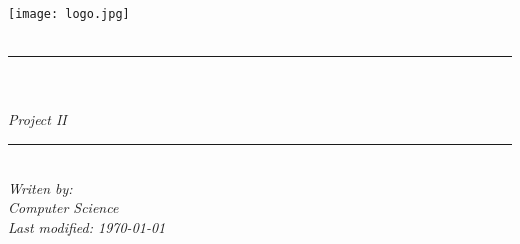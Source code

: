 \documentclass[11pt, a4paper, oneside]{Thesis}
\title{\ttitle} %
\begin{document}
\frontmatter 


\fancyhead{} %
\rhead{\thepage} %
\lhead{} %

\pagestyle{fancy} %

\newcommand{\HRule}{\rule{\linewidth}{0.5mm}} %

\hypersetup{pdfsubject=\subjectname}
\hypersetup{pdfauthor=\authornames}
\hypersetup{pdfkeywords=\keywordnames}


\begin{titlepage}
\begin{center}

\texttt{[image: logo.jpg]}\\[1cm] %
\textsc{\LARGE \univname}\\[1.5cm] %
\HRule \\[1.0cm] %
{\huge \bfseries \ttitle}\\[0.4cm] %

\huge \textit {Project II}\\[0.1cm] %
\HRule \\[1.5cm] %

\small \textit{Writen by: \authornames}\\[0.5cm] %
\textit{Computer Science}\\[2cm] %
\textit{\large Last modified: \today}\\[4cm] %

 
\vfill
\end{center}

\end{titlepage}
\end{document}
